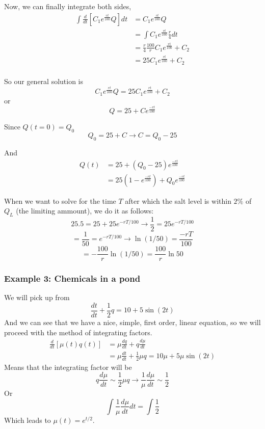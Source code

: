 Now, we can finally integrate both sides,
\begin{align*}
    \int \frac{d}{dt} \left[ C_1e^{\frac{rt}{100}} Q \right] dt  &=  C_1e^{\frac{rt}{100}} Q     \\
    &= \int C_1e^{\frac{rt}{100}} \frac{r}{4} dt    \\
    &= \frac{r}{4} \frac{100}{r} C_1e^{\frac{rt}{100}} + C_2 \\
    &= 25 C_1e^{\frac{rt}{100}} + C_2 \\
\end{align*}

So our general solution is
$$
C_1e^{\frac{rt}{100}} Q = 25 C_1e^{\frac{rt}{100}} + C_2
$$
or
$$
Q = 25 + C e^{\frac{-rt}{100}}
$$

Since $Q(t=0) = Q_0$
$$
Q_0 = 25 + C \rightarrow C = Q_0 - 25
$$

And
\begin{align*}
    Q(t) &= 25 + (Q_0 - 25) e^{\frac{-rt}{100}} \\
    &= 25(1 - e^{\frac{-rt}{100}}) + Q_0 e^{\frac{-rt}{100}}
\end{align*}

When we want to solve for the time $T$ after which the salt level is within $2\%$ of $Q_L$ (the limiting ammount),
we do it as follows:
$$
25.5 = 25 + 25 e^{-rT/100} \rightarrow \frac{1}{2} = 25 e^{-rT/100}
$$
$$
= \frac{1}{50} = e^{-rT/100} \rightarrow \ln (1/50) = \frac{-rT}{100}
$$
$$
= - \frac{100}{r} \ln(1/50) = \frac{100}{r} \ln{50}
$$


\subsubsection{Example 3: Chemicals in a pond}

We will pick up from
$$
\frac{dt}{dt} + \frac{1}{2}q = 10 + 5\sin(2t)
$$
And we can see that we have a nice, simple, first order, linear equation, so we will proceed with
the method of integrating factors.
\begin{align*}
\frac{d}{dt} \left[ \mu(t) q(t) \right] &= \mu \frac{dq}{dt} + q\frac{d\mu}{dt} \\
&= \mu\frac{dt}{dt} + \frac{1}{2}\mu q = 10\mu + 5\mu\sin(2t)
\end{align*}
Means that the integrating factor will be
$$
q\frac{d\mu}{dt} \sim \frac{1}{2}\mu q \rightarrow
\frac{1}{\mu}\frac{d\mu}{dt} \sim \frac{1}{2}
$$
Or
$$
\int \frac{1}{\mu}\frac{d\mu}{dt} dt = \int \frac{1}{2}
$$
Which leads to $\mu(t) = e^{t/2}$.

